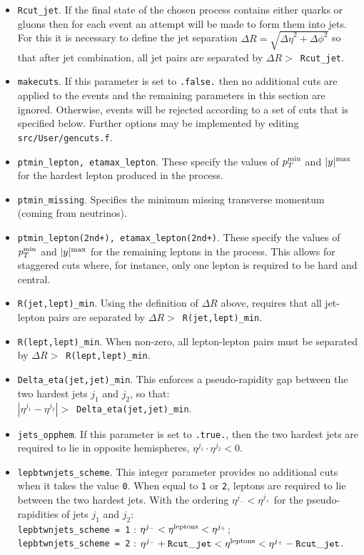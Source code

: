 \documentclass[12pt]{article}
\begin{document}
\begin{itemize}
\item {\tt Rcut\_jet}. If the final state of the chosen process contains
either quarks or gluons then for each event an attempt will be made
to form them into jets. For this it is necessary to define the
jet separation $\Delta R=\sqrt{{\Delta \eta}^2 + {\Delta \phi}^2}$
so that after jet combination, all jet pairs are separated by
$\Delta R >$~{\tt Rcut\_jet}.

\item {\tt makecuts}. If this parameter is set to {\tt .false.} then
no additional cuts are applied to the events and the remaining
parameters in this section are ignored. Otherwise, events will
be rejected according to a set of cuts that is specified below.
Further options may be implemented by editing {\tt src/User/gencuts.f}.

\item {\tt ptmin\_lepton, etamax\_lepton}. These specify the values
of $p_T^{\rm min}$ and $|y|^{\rm max}$ for the hardest lepton produced
in the process.
\item {\tt ptmin\_missing}. Specifies the minimum missing transverse
momentum (coming from neutrinos).
\item {\tt ptmin\_lepton(2nd+), etamax\_lepton(2nd+)}. These specify
the values of $p_T^{\rm min}$ and $|y|^{\rm max}$ for the remaining
leptons in the process. This allows for staggered cuts where, for
instance, only one lepton is required to be hard and central.

\item {\tt R(jet,lept)\_min}. Using the definition of $\Delta R$ above,
requires that all jet-lepton pairs are separated by
$\Delta R >$~{\tt R(jet,lept)\_min}.

\item {\tt R(lept,lept)\_min}. When non-zero, all lepton-lepton pairs
must be separated by $\Delta R >$~{\tt R(lept,lept)\_min}.

\item {\tt Delta\_eta(jet,jet)\_min}. This enforces a pseudo-rapidity
gap between the two hardest jets $j_1$ and $j_2$, so that: \\
$|\eta^{j_1} - \eta^{j_2}| >$~{\tt Delta\_eta(jet,jet)\_min}.

\item {\tt jets\_opphem}. If this parameter is set to {\tt .true.},
then the two hardest jets are required to lie in opposite hemispheres,
$\eta^{j_1} \cdot \eta^{j_2} < 0$.

\item {\tt lepbtwnjets\_scheme}. This integer parameter provides no
additional cuts when it takes the value {\tt 0}. When equal to
{\tt 1} or {\tt 2}, leptons are required to lie between the two
hardest jets. With the ordering $\eta^{j_-} < \eta^{j_+}$ for the
pseudo-rapidities of jets $j_1$ and $j_2$: \\
{\tt lepbtwnjets\_scheme = 1} : 
 $\eta^{j_-} < \eta^{\rm leptons} < \eta^{j_+}$; \\
{\tt lepbtwnjets\_scheme = 2} :
 $\eta^{j_-}+{\tt Rcut\_jet} < \eta^{\rm leptons} < \eta^{j_+}-{\tt Rcut\_jet}$.


\end{itemize}
\end{document}
